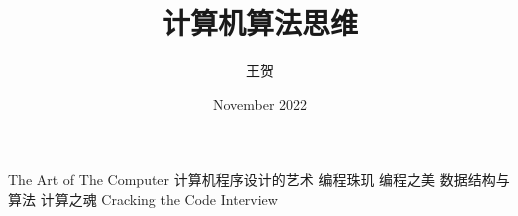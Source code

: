 \documentclass[a4paper,12pt]{ctexbook}
\begin{document}
\setmainfont{Hack Nerd Font}    
\author{王贺}
\title{计算机算法思维}
\date{November 2022}

\frontmatter
\maketitle
\tableofcontents

\mainmatter





\backmatter
\begin{thebibliography}{99}
\bibitem{}The Art of The Computer
\bibitem{}计算机程序设计的艺术
\bibitem{}编程珠玑
\bibitem{}编程之美
\bibitem{}数据结构与算法
\bibitem{}计算之魂
\bibitem{}Cracking the Code Interview

\end{thebibliography}
\end{document}
